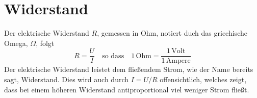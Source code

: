 \documentclass{article}
\begin{document}
\section{Widerstand}
Der elektrische Widerstand $R$, gemessen in Ohm, notiert duch das griechische Omega, $\Omega$, folgt
\[
 R = \frac{U}{I}
 \quad \text{so dass} \quad
 1\,\text{Ohm} = \frac{1\,\text{Volt}}{1\,\text{Ampere}} 
\] 
Der elektrische Widerstand leistet dem fließendem Strom, wie der Name bereits sagt, Widerstand. Dies wird auch durch $I = U / R$ offensichtlich, welches zeigt, dass bei einem höheren Widerstand antiproportional viel weniger Strom fließt.
\end{document}
